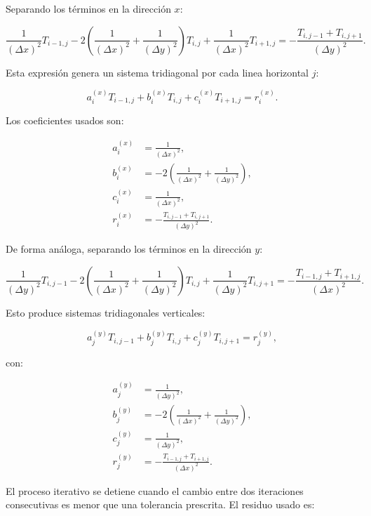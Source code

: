 \documentclass[11pt,a4paper]{article}
\begin{document}
Separando los t\'erminos en la direcci\'on $x$:

\begin{equation}
\frac{1}{(\Delta x)^2}T_{i-1,j}
-2\left(\frac{1}{(\Delta x)^2}+\frac{1}{(\Delta y)^2}\right)T_{i,j}
+\frac{1}{(\Delta x)^2}T_{i+1,j}
=-\frac{T_{i,j-1}+T_{i,j+1}}{(\Delta y)^2}.
\end{equation}

Esta expresi\'on genera un sistema tridiagonal por cada linea horizontal
$j$:

\begin{equation}
a_i^{(x)}T_{i-1,j}+b_i^{(x)}T_{i,j}+c_i^{(x)}T_{i+1,j}=r_i^{(x)}.
\end{equation}

Los coeficientes usados son:

\begin{align}
a_i^{(x)} &= \frac{1}{(\Delta x)^2}, \\
b_i^{(x)} &= -2\left(\frac{1}{(\Delta x)^2}+\frac{1}{(\Delta y)^2}\right), \\
c_i^{(x)} &= \frac{1}{(\Delta x)^2}, \\
r_i^{(x)} &= -\frac{T_{i,j-1}+T_{i,j+1}}{(\Delta y)^2}.
\end{align}

De forma an\'aloga, separando los t\'erminos en la direcci\'on $y$:

\begin{equation}
\frac{1}{(\Delta y)^2}T_{i,j-1}
-2\left(\frac{1}{(\Delta x)^2}+\frac{1}{(\Delta y)^2}\right)T_{i,j}
+\frac{1}{(\Delta y)^2}T_{i,j+1}
=-\frac{T_{i-1,j}+T_{i+1,j}}{(\Delta x)^2}.
\end{equation}

Esto produce sistemas tridiagonales verticales:

\begin{equation}
a_j^{(y)}T_{i,j-1}+b_j^{(y)}T_{i,j}+c_j^{(y)}T_{i,j+1}=r_j^{(y)},
\end{equation}

con:

\begin{align}
a_j^{(y)} &= \frac{1}{(\Delta y)^2}, \\
b_j^{(y)} &= -2\left(\frac{1}{(\Delta x)^2}+\frac{1}{(\Delta y)^2}\right), \\
c_j^{(y)} &= \frac{1}{(\Delta y)^2}, \\
r_j^{(y)} &= -\frac{T_{i-1,j}+T_{i+1,j}}{(\Delta x)^2}.
\end{align}

El proceso iterativo se detiene cuando el cambio entre dos iteraciones
consecutivas es menor que una tolerancia prescrita. El residuo usado es:
\end{document}
